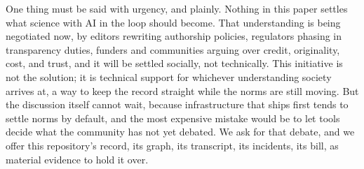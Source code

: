 \ifextended\fi
One thing must be said with urgency, and plainly. Nothing in this
paper settles what science with AI in the loop should become. That
understanding is being negotiated now, by editors rewriting authorship
policies, regulators phasing in transparency duties, funders and
communities arguing over credit, originality, cost, and trust, and it
will be settled socially, not technically. This initiative is not the
solution; it is technical support for whichever understanding society
arrives at, a way to keep the record straight while the norms are
still moving. But the discussion itself cannot wait, because
infrastructure that ships first tends to settle norms by default, and
the most expensive mistake would be to let tools decide what the
community has not yet debated. We ask for that debate, and we offer
this repository's record, its graph, its transcript, its incidents,
its bill, as material evidence to hold it over.
